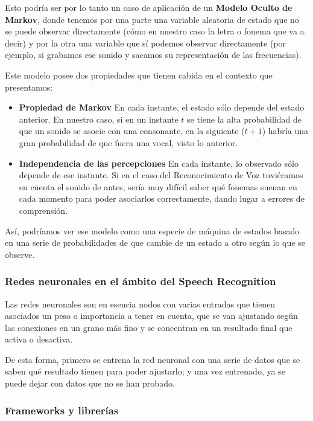 Esto podría ser por lo tanto un caso de aplicación de un \textbf{Modelo Oculto de Markov}\cite{modelo-markov}, donde tenemos por una parte una variable aleatoria de estado que no se puede observar directamente (cómo en nuestro caso la letra o fonema que va a decir) y por la otra una variable que sí podemos observar directamente (por ejemplo, si grabamos ese sonido y sacamos su representación de las frecuencias).

Este modelo posee dos propiedades que tienen cabida en el contexto que presentamos:
\begin{itemize}
	\item \textbf{Propiedad de Markov} En cada instante, el estado sólo depende del estado anterior. En nuestro caso, si en un instante $t$ se tiene la alta probabilidad de que un sonido se asocie con una consonante, en la siguiente ($t+1$) habría una gran probabilidad de que fuera una vocal, visto lo anterior.
	
	\item \textbf{Independencia de las percepciones} En cada instante, lo observado sólo depende de ese instante. Si en el caso del Reconocimiento de Voz tuviéramos en cuenta el sonido de antes, sería muy difícil saber qué fonemas suenan en cada momento para poder asociarlos correctamente, dando lugar a errores de comprensión.
\end{itemize}

Así, podríamos ver ese modelo como una especie de máquina de estados basado en una serie de probabilidades de que cambie de un estado a otro según lo que se observe.

\subsubsection{Redes neuronales en el ámbito del Speech Recognition}
Las redes neuronales son en esencia nodos con varias entradas que tienen asociados un peso o importancia a tener en cuenta, que se van ajustando según las conexiones en un grano más fino y se concentran en un resultado final que activa o desactiva.

De esta forma, primero se entrena la red neuronal con una serie de datos que se saben qué resultado tienen para poder ajustarlo; y una vez entrenado, ya se puede dejar con datos que no se han probado.

\subsubsection{Frameworks y librerías}

